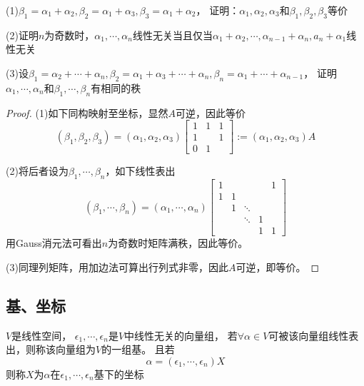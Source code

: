 \begin{exercise}[同构的应用]
  (1)$\beta_1 = \alpha_1 + \alpha_2, \beta_2 = \alpha_1 + \alpha_3, \beta_3 = \alpha_1 + \alpha_2$，
  证明：$\alpha_1,\alpha_2,\alpha_3$和$\beta_1,\beta_2,\beta_3$等价

  (2)证明$n$为奇数时，$\alpha_1,\cdots,\alpha_n$线性无关当且仅当$\alpha_1 + \alpha_2,\cdots,\alpha_{n-1}+\alpha_n, a_n+\alpha_1$线性无关

  (3)设$\beta_1 = \alpha_2 + \cdots + \alpha_n, \beta_2 = \alpha_1 + \alpha_3 + \cdots + \alpha_n, \beta_n = \alpha_1 + \cdots + \alpha_{n-1}$，
  证明$\alpha_1,\cdots,\alpha_n$和$\beta_1,\cdots,\beta_n$有相同的秩
\end{exercise}

\begin{proof}
  (1)如下同构映射至坐标，显然$A$可逆，因此等价
  \begin{equation*}
    (\beta_1,\beta_2,\beta_3) = (\alpha_1,\alpha_2,\alpha_3) \left[
      \begin{array}{ccc}
        1&1&1 \\
         1&&1 \\
         0&1&
      \end{array}
    \right] := (\alpha_1,\alpha_{2},\alpha_3)A
  \end{equation*}

  (2)将后者设为$\beta_1,\cdots,\beta_n$，如下线性表出
  \begin{equation*}
    (\beta_1,\cdots,\beta_n) = (\alpha_1,\cdots,\alpha_n) \left[
      \begin{array}{ccccc}
        1&&&&1 \\
         1&1&&& \\
         &1&\ddots&& \\
         &&\ddots&1& \\
         &&&1&1
      \end{array}
    \right]
  \end{equation*}
  用Gauss消元法可看出$n$为奇数时矩阵满秩，因此等价。

  (3)同理列矩阵，用加边法可算出行列式非零，因此$A$可逆，即等价。
\end{proof}


\subsection{基、坐标}

\begin{definition}[基与坐标]
  $V$是线性空间，
  $\epsilon_1,\cdots,\epsilon_n$是$V$中线性无关的向量组，
  若$\forall \alpha \in V$可被该向量组线性表出，则称该向量组为$V$的一组基。
  且若
  \begin{equation*}
    \alpha = (\epsilon_1, \cdots, \epsilon_n)X
  \end{equation*}
  则称$X$为$\alpha$在$\epsilon_1,\cdots,\epsilon_n$基下的坐标
\end{definition}


